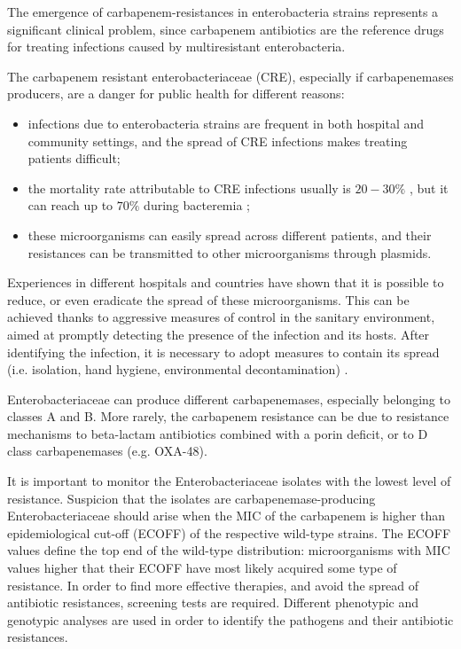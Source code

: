 \documentclass[11pt]{report}
\begin{document}
The emergence of carbapenem-resistances in enterobacteria strains represents a significant clinical problem, since carbapenem antibiotics are the reference drugs for treating infections caused by multiresistant enterobacteria.

The carbapenem resistant enterobacteriaceae (CRE), especially if carbapenemases producers, are a danger for public health for different reasons:
\begin{itemize}
\item infections due to enterobacteria strains are frequent in both hospital and community settings, and the spread of CRE infections makes treating patients difficult;
\item the mortality rate attributable to CRE infections usually is $20-30\%$  \cite{carmeli2010controlling}, but it can reach up to $70\%$ during bacteremia \cite{mouloudi2010bloodstream};
\item these microorganisms can easily spread across different patients, and their resistances can be transmitted to other microorganisms through plasmids.
\end{itemize}

Experiences in different hospitals and countries have shown that it is possible to reduce, or even eradicate the spread of these microorganisms.
This can be achieved thanks to aggressive measures of control in the sanitary environment, aimed at promptly detecting the presence of the infection and its hosts.
After identifying the infection, it is necessary to adopt measures to contain its spread (i.e. isolation, hand hygiene, environmental decontamination) \cite{gupta2011carbapenem}.

Enterobacteriaceae can produce different carbapenemases, especially belonging to classes A and B.
More rarely, the carbapenem resistance can be due to resistance mechanisms to beta-lactam antibiotics combined with a porin deficit, or to D class carbapenemases (e.g. OXA-48).

It is important to monitor the Enterobacteriaceae isolates with the lowest level of resistance.
Suspicion that the isolates are carbapenemase-producing Enterobacteriaceae should arise when the MIC of the carbapenem is higher than epidemiological cut-off (ECOFF) of the respective wild-type strains.
The ECOFF values define the top end of the wild-type distribution: microorganisms with MIC values higher that their ECOFF have most likely acquired some type of resistance.
In order to find more effective therapies, and avoid the spread of antibiotic resistances, screening tests are required.
Different phenotypic and genotypic analyses are used in order to identify the pathogens and their antibiotic resistances.
\end{document}
